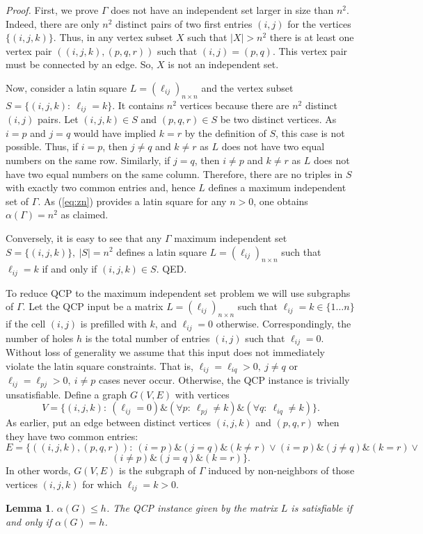 \documentclass[11pt]{article}
\newtheorem{lem}{Lemma}
\begin{document}
{\em Proof.\/} First, we prove $\Gamma$ does not have an independent set larger 
in size than $n^2$. Indeed, there are only $n^2$ distinct pairs of two first 
entries $(i,j)$ for the vertices $\{(i,j,k)\}$. Thus, in any vertex subset $X$ 
such that $|X|>n^2$ there is at least one vertex pair $((i,j,k),(p,q,r))$ such 
that $(i,j)=(p,q)$. This vertex pair must be connected by an edge. So, $X$ is 
not an independent set.

Now, consider a latin square $L=(\ell_{ij})_{n \times n}$ and the vertex subset 
$S=\{(i,j,k): \ \ell_{ij}=k\}$. It contains $n^2$ vertices because there are 
$n^2$ distinct $(i,j)$ pairs. Let $(i,j,k) \in S$ and $(p,q,r) \in S$ be two 
distinct vertices. As $i=p$ and $j=q$ would have implied $k=r$ by the definition 
of $S$, this case is not possible. Thus, if $i=p$, then $j \neq q$ and $k \neq r$
as $L$ does not have two equal numbers on the same row. Similarly, if $j=q$, 
then $i \neq p$ and $k \neq r$ as $L$ does not have two equal numbers on the 
same column. Therefore, there are no triples in $S$ with exactly two common 
entries and, hence $L$ defines a maximum independent set of $\Gamma$. As 
(\ref{eq:zn}) provides a latin square for any $n>0$, one obtains 
$\alpha(\Gamma)=n^2$ as claimed.

Conversely, it is easy to see that any $\Gamma$ maximum independent set 
$S=\{(i,j,k)\}, \ |S|=n^2$ defines a latin square $L=(\ell_{ij})_{n \times n}$ 
such that $\ell_{ij}=k$ if and only if $(i,j,k) \in S$. QED.

\vspace{1pc}

To reduce QCP to the maximum independent set problem we will use subgraphs of 
$\Gamma$. Let the QCP input be a matrix $L=(\ell_{ij})_{n \times n}$ such that 
$\ell_{ij}=k \in \{1 \ldots n\}$ if the cell $(i,j)$ is prefilled with $k$, and 
$\ell_{ij}=0$ otherwise. Correspondingly, the number of holes $h$ is the total 
number of entries $(i,j)$ such that $\ell_{ij}=0$. Without loss of generality we 
assume that this input does not immediately violate the latin square 
constraints. That is, $\ell_{ij}=\ell_{iq}>0, \ j \neq q$ or 
$\ell_{ij}=\ell_{pj}>0, \ i \neq p$ cases never occur. Otherwise, the QCP 
instance is trivially unsatisfiable. Define a graph $G(V,E)$ with vertices
\begin{equation}
\label{eq:qcp_v}
V=\{(i,j,k): \ (\ell_{ij}=0) \& (\forall p: \ \ell_{pj} \neq k) \& (\forall q: \ \ell_{iq} \neq k) \}.
\end{equation}
As earlier, put an edge between distinct vertices $(i,j,k)$ and $(p,q,r)$ when 
they have two common entries:
\[ E=\{((i,j,k),(p,q,r)): \ (i=p) \& (j=q) \& (k \neq r) \lor (i=p) \& (j \neq q) \& (k=r) \lor \]
\begin{equation}
\label{eq:qcp_e}
(i \neq p) \& (j=q) \& (k=r)\}.
\end{equation}
In other words, $G(V,E)$ is the subgraph of $\Gamma$ induced by non-neighbors of 
those vertices $(i,j,k)$ for which $\ell_{ij}=k>0$.
\begin{lem}
$\alpha(G) \leq h$. The QCP instance given by the matrix $L$ is satisfiable if 
and only if $\alpha(G)=h$.
\end{lem}
\end{document}
